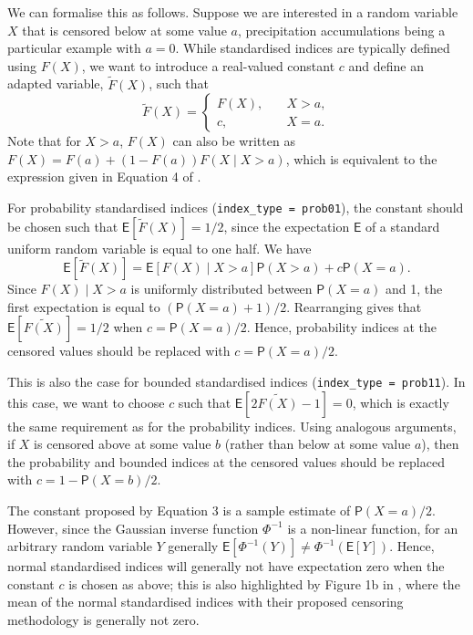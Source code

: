 We can formalise this as follows. Suppose we are interested in a random variable \(X\) that is censored below at some value \(a\), precipitation accumulations being a particular example with \(a = 0\). While standardised indices are typically defined using \(F(X)\), we want to introduce a real-valued constant \(c\) and define an adapted variable, \(\tilde{F}(X)\), such that
\[
\tilde{F}(X) = \begin{cases}
F(X), &\quad X > a, \\
c, &\quad X = a.
\end{cases}
\]
Note that for \(X > a\), \(F(X)\) can also be written as \(F(X) = F(a) + (1 - F(a)) F(X \mid X > a)\), which is equivalent to the expression given in Equation 4 of \cite{StaggeEtAl2015}.

For probability standardised indices (\texttt{index\_type\ =\ \textquotesingle{}prob01\textquotesingle{}}), the constant should be chosen such that \(\mathsf{E}[\tilde{F}(X)] = 1/2\), since the expectation \(\mathsf{E}\) of a standard uniform random variable is equal to one half. We have
\[
\mathsf{E}[\tilde{F}(X)] = \mathsf{E}[F(X) \mid X > a]\mathsf{P}(X > a) + c\mathsf{P}(X = a).
\]
Since \(F(X) \mid X > a\) is uniformly distributed between \(\mathsf{P}(X = a)\) and 1, the first expectation is equal to \((\mathsf{P}(X = a) + 1)/2\). Rearranging gives that \(\mathsf{E}[\tilde{F(X)}] = 1/2\) when \(c = \mathsf{P}(X = a)/2\). Hence, probability indices at the censored values should be replaced with \(c = \mathsf{P}(X = a)/2\).

This is also the case for bounded standardised indices (\texttt{index\_type\ =\ \textquotesingle{}prob11\textquotesingle{}}). In this case, we want to choose \(c\) such that \(\mathsf{E}[2\tilde{F(X)} - 1] = 0\), which is exactly the same requirement as for the probability indices. Using analogous arguments, if \(X\) is censored above at some value \(b\) (rather than below at some value \(a\)), then the probability and bounded indices at the censored values should be replaced with \(c = 1 - \mathsf{P}(X = b)/2\).

The constant proposed by \cite{StaggeEtAl2015} Equation 3 is a sample estimate of \(\mathsf{P}(X = a)/2\). However, since the Gaussian inverse function \(\Phi^{-1}\) is a non-linear function, for an arbitrary random variable \(Y\) generally \(\mathsf{E}[\Phi^{-1}(Y)] \neq \Phi^{-1}(\mathsf{E}[Y])\). Hence, normal standardised indices will generally not have expectation zero when the constant \(c\) is chosen as above; this is also highlighted by Figure 1b in \cite{StaggeEtAl2015}, where the mean of the normal standardised indices with their proposed censoring methodology is generally not zero.

